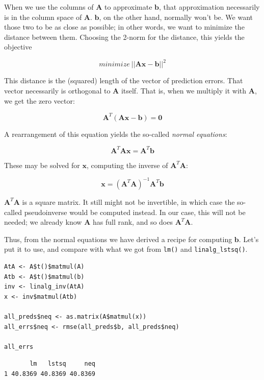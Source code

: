 \documentclass[
  letterpaper,
]{krantz}
\begin{document}
When we use the columns of \(\mathbf{A}\) to approximate \(\mathbf{b}\),
that approximation necessarily is in the column space of \(\mathbf{A}\).
\(\mathbf{b}\), on the other hand, normally won't be. We want those two
to be as close as possible; in other words, we want to minimize the
distance between them. Choosing the 2-norm for the distance, this yields
the objective

\[
minimize \ ||\mathbf{Ax}-\mathbf{b}||^2
\]

This distance is the (squared) length of the vector of prediction
errors. That vector necessarily is orthogonal to \(\mathbf{A}\) itself.
That is, when we multiply it with \(\mathbf{A}\), we get the zero
vector:

\[
\mathbf{A}^T(\mathbf{Ax} - \mathbf{b}) = \mathbf{0}
\]

A rearrangement of this equation yields the so-called \emph{normal
equations}:

\[
\mathbf{A}^T \mathbf{A} \mathbf{x} = \mathbf{A}^T \mathbf{b}
\]

These may be solved for \(\mathbf{x}\), computing the inverse of
\(\mathbf{A}^T\mathbf{A}\):

\[
\mathbf{x} = (\mathbf{A}^T \mathbf{A})^{-1} \mathbf{A}^T \mathbf{b}
\]

\(\mathbf{A}^T\mathbf{A}\) is a square matrix. It still might not be
invertible, in which case the so-called pseudoinverse would be computed
instead. In our case, this will not be needed; we already know
\(\mathbf{A}\) has full rank, and so does \(\mathbf{A}^T\mathbf{A}\).

Thus, from the normal equations we have derived a recipe for computing
\(\mathbf{b}\). Let's put it to use, and compare with what we got from
\texttt{lm()} and \texttt{linalg\_lstsq()}.

\begin{verbatim}
AtA <- A$t()$matmul(A)
Atb <- A$t()$matmul(b)
inv <- linalg_inv(AtA)
x <- inv$matmul(Atb)

all_preds$neq <- as.matrix(A$matmul(x))
all_errs$neq <- rmse(all_preds$b, all_preds$neq)

all_errs
\end{verbatim}

\begin{verbatim}
       lm   lstsq     neq
1 40.8369 40.8369 40.8369
\end{verbatim}
\end{document}
